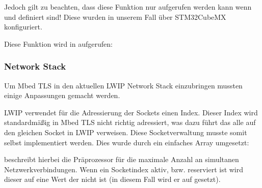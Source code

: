 \documentclass[letterpaper,10pt,ngerman]{sphinxmanual}
\begin{document}
Jedoch gilt zu beachten, dass diese Funktion nur aufgerufen werden kann wenn  und  definiert sind! Diese wurden in unserem Fall über STM32CubeMX konfiguriert.

Diese Funktion wird in  aufgerufen:

\begin{sphinxVerbatim}[commandchars=\\\{\}]
 
 
 

 
     
\end{sphinxVerbatim}


\subsubsection{Network Stack}
\label{\detokenize{seccom:network-stack}}
Um Mbed TLS in den aktuellen LWIP Network Stack einzubringen mussten einige Anpassungen gemacht werden.

LWIP verwendet für die Adressierung der Sockets einen Index.
Dieser Index wird standardmäßig in Mbed TLS nicht richtig adressiert, was dazu führt das alle  auf den gleichen Socket in LWIP verweisen. Diese Socketverwaltung musste somit selbst implementiert werden.
Dies wurde durch ein einfaches Array umgesetzt:

\begin{sphinxVerbatim}[commandchars=\\\{\}]
 \PYG{p}{[}\PYG{p}{]}  
\end{sphinxVerbatim}

 beschreibt hierbei die Präprozessor für die maximale Anzahl an simultanen Netzwerkverbindungen.
Wenn ein Socketindex aktiv, bzw. reserviert ist wird dieser auf eine Wert der nicht  ist (in diesem Fall wird er auf  gesetzt).
\end{document}
